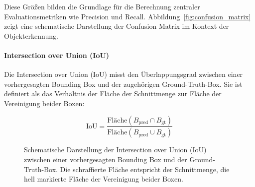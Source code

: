 Diese Größen bilden die Grundlage für die Berechnung zentraler
Evaluationsmetriken wie Precision und Recall. Abbildung~\ref{fig:confusion_matrix} zeigt eine schematische Darstellung der Confusion Matrix im Kontext der
Objekterkennung.

\paragraph{Intersection over Union (IoU)}
Die Intersection over Union (IoU) misst den Überlappungsgrad zwischen einer
vorhergesagten Bounding Box und der zugehörigen Ground-Truth-Box. Sie ist definiert
als das Verhältnis der Fläche der Schnittmenge zur Fläche der Vereinigung beider
Boxen:

\begin{equation}
\text{IoU} = \frac{\text{Fläche}(B_{\text{pred}} \cap B_{\text{gt}})}
{\text{Fläche}(B_{\text{pred}} \cup B_{\text{gt}})}
\end{equation}

\begin{figure}[H]
    \centering
    \caption{Schematische Darstellung der Intersection over Union (IoU) zwischen einer vorhergesagten Bounding Box und der Ground-Truth-Box. Die schraffierte Fläche entspricht der Schnittmenge, die hell markierte Fläche der Vereinigung beider Boxen.}
    \label{fig:iou_visualization}
\end{figure}


